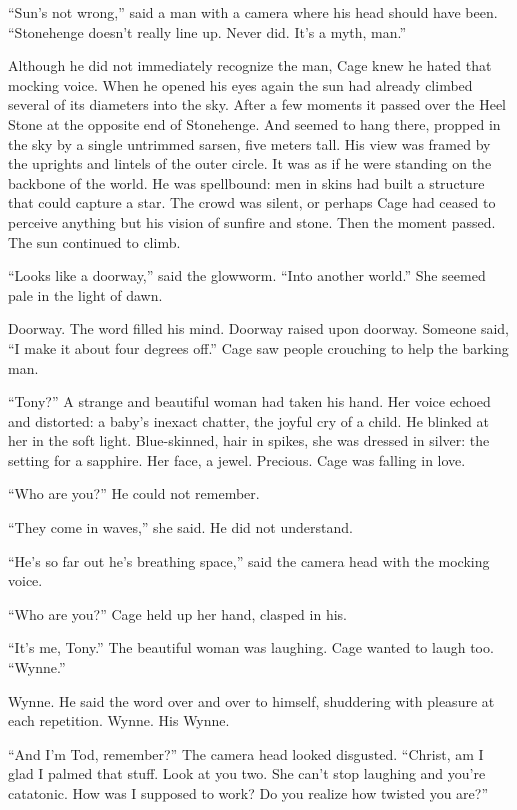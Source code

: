 ``Sun's not wrong,'' said a man with a camera where his head should have been. ``Stonehenge doesn't really line up. Never did. It's a myth, man.''

Although he did not immediately recognize the man, Cage knew he hated that mocking voice. When he opened his eyes again the sun had already climbed several of its diameters into the sky. After a few moments it passed over the Heel Stone at the opposite end of Stonehenge. And seemed to hang there, propped in the sky by a single untrimmed sarsen, five meters tall. His view was framed by the uprights and lintels of the outer circle. It was as if he were standing on the backbone of the world. He was spellbound: men in skins had built a structure that could capture a star. The crowd was silent, or perhaps Cage had ceased to perceive anything but his vision of sunfire and stone. Then the moment passed. The sun continued to climb.

``Looks like a doorway,'' said the glowworm. ``Into another world.'' She seemed pale in the light of dawn.

Doorway. The word filled his mind. Doorway raised upon doorway. Someone said, ``I make it about four degrees off.'' Cage saw people crouching to help the barking man.

``Tony?'' A strange and beautiful woman had taken his hand. Her voice echoed and distorted: a baby's inexact chatter, the joyful cry of a child. He blinked at her in the soft light. Blue-skinned, hair in spikes, she was dressed in silver: the setting for a sapphire. Her face, a jewel. Precious. Cage was falling in love.

``Who are you?'' He could not remember.

``They come in waves,'' she said. He did not understand.

``He's so far out he's breathing space,'' said the camera head with the mocking voice.

``Who are you?'' Cage held up her hand, clasped in his.

``It's me, Tony.'' The beautiful woman was laughing. Cage wanted to laugh too. ``Wynne.''

Wynne. He said the word over and over to himself, shuddering with pleasure at each repetition. Wynne. His Wynne.

``And I'm Tod, remember?'' The camera head looked disgusted. ``Christ, am I glad I palmed that stuff. Look at you two. She can't stop laughing and you're catatonic. How was I supposed to work? Do you realize how twisted you are?''

